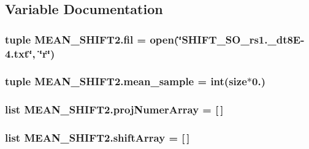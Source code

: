 \subsection{Variable Documentation}
\hypertarget{namespaceMEAN__SHIFT2_a429b645482b4f4848eac1d7ccab15bb8}{
\subsubsection[{fil}]{\setlength{\rightskip}{0pt plus 5cm}tuple M\-E\-A\-N\-\_\-\-S\-H\-I\-F\-T2.\-fil = open(\char`\"{}S\-H\-I\-F\-T\-\_\-S\-O\-\_\-rs1.\-\_\-dt8\-E-\/4.txt\char`\"{}, \char`\"{}r\char`\"{})}}\label{namespaceMEAN__SHIFT2_a429b645482b4f4848eac1d7ccab15bb8}
\hypertarget{namespaceMEAN__SHIFT2_aa93731cd8c0824625a82574955eb220f}{
\subsubsection[{mean\-\_\-sample}]{\setlength{\rightskip}{0pt plus 5cm}tuple M\-E\-A\-N\-\_\-\-S\-H\-I\-F\-T2.\-mean\-\_\-sample = int({\bf size}$\ast$0.)}}\label{namespaceMEAN__SHIFT2_aa93731cd8c0824625a82574955eb220f}
\hypertarget{namespaceMEAN__SHIFT2_ab52cb1545ab067638f1ed65ce37690e1}{
\subsubsection[{proj\-Numer\-Array}]{\setlength{\rightskip}{0pt plus 5cm}list M\-E\-A\-N\-\_\-\-S\-H\-I\-F\-T2.\-proj\-Numer\-Array = \mbox{[}$\,$\mbox{]}}}\label{namespaceMEAN__SHIFT2_ab52cb1545ab067638f1ed65ce37690e1}
\hypertarget{namespaceMEAN__SHIFT2_a84af3541352c1d75a94b9d21f5ceb9e2}{
\subsubsection[{shift\-Array}]{\setlength{\rightskip}{0pt plus 5cm}list M\-E\-A\-N\-\_\-\-S\-H\-I\-F\-T2.\-shift\-Array = \mbox{[}$\,$\mbox{]}}}\label{namespaceMEAN__SHIFT2_a84af3541352c1d75a94b9d21f5ceb9e2}
